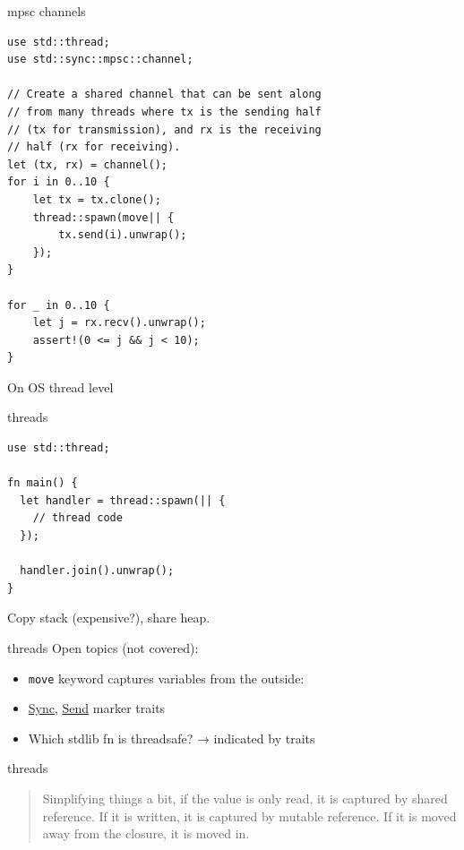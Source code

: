 \documentclass{beamer}
\begin{document}
\begin{frame}[fragile]{mpsc channels}
  \begin{verbatim}
use std::thread;
use std::sync::mpsc::channel;

// Create a shared channel that can be sent along
// from many threads where tx is the sending half
// (tx for transmission), and rx is the receiving
// half (rx for receiving).
let (tx, rx) = channel();
for i in 0..10 {
    let tx = tx.clone();
    thread::spawn(move|| {
        tx.send(i).unwrap();
    });
}

for _ in 0..10 {
    let j = rx.recv().unwrap();
    assert!(0 <= j && j < 10);
}
  \end{verbatim}
\end{frame}

\begin{frame}[standout]
  On OS thread level
\end{frame}

\begin{frame}[fragile]{threads}
  \begin{verbatim}
use std::thread;

fn main() {
  let handler = thread::spawn(|| {
    // thread code
  });

  handler.join().unwrap();
}
  \end{verbatim}

  Copy stack (expensive?), share heap.
\end{frame}

\begin{frame}[fragile]{threads}
  Open topics (not covered):
  \begin{itemize}
    \item \texttt{move} keyword captures variables from the outside: 
    \item \href{https://doc.rust-lang.org/std/marker/trait.Sync.html}{Sync}, \href{https://doc.rust-lang.org/std/marker/trait.Send.html}{Send} marker traits
    \item Which stdlib fn is threadsafe? → indicated by traits
  \end{itemize}
\end{frame}

\begin{frame}[fragile]{threads}
  \begin{quote}
Simplifying things a bit, if the value is only read, it is captured by shared reference. If it is written, it is captured by mutable reference. If it is moved away from the closure, it is moved in.
  \end{quote}
\end{frame}
\end{document}
